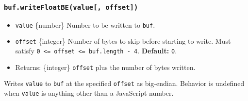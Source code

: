 \begin{Shaded}
\begin{Highlighting}[]
\NormalTok{ \{ }\NormalTok{ \} }\OperatorTok{=} \NormalTok{(}\NormalTok{)}\OperatorTok{;}

\OperatorTok{=} \NormalTok{(}\NormalTok{)}\OperatorTok{;}

\NormalTok{(}\OperatorTok{,} \NormalTok{)}\OperatorTok{;}

\OperatorTok{;}
\end{Highlighting}
\end{Shaded}

\subsubsection{\texorpdfstring{\texttt{buf.writeFloatBE(value{[},\ offset{]})}}{buf.writeFloatBE(value{[}, offset{]})}}\label{buf.writefloatbevalue-offset}

\begin{itemize}
\tightlist
\item
  \texttt{value} \{number\} Number to be written to \texttt{buf}.
\item
  \texttt{offset} \{integer\} Number of bytes to skip before starting to
  write. Must satisfy
  \texttt{0\ \textless{}=\ offset\ \textless{}=\ buf.length\ -\ 4}.
  \textbf{Default:} \texttt{0}.
\item
  Returns: \{integer\} \texttt{offset} plus the number of bytes written.
\end{itemize}

Writes \texttt{value} to \texttt{buf} at the specified \texttt{offset}
as big-endian. Behavior is undefined when \texttt{value} is anything
other than a JavaScript number.

\begin{Shaded}
\begin{Highlighting}[]
\NormalTok{ \{ }\NormalTok{ \} } \OperatorTok{;}

\OperatorTok{=} \NormalTok{(}\NormalTok{)}\OperatorTok{;}

\NormalTok{(}\OperatorTok{,} \NormalTok{)}\OperatorTok{;}

\OperatorTok{;}
\end{Highlighting}
\end{Shaded}

